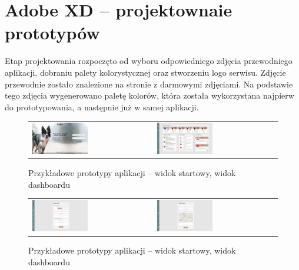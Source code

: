 \section{Adobe XD -- projektownaie prototypów}
Etap projektowania rozpoczęto od wyboru odpowiedniego zdjęcia przewodniego aplikacji, dobraniu palety kolorystycznej oraz stworzeniu logo serwisu. Zdjęcie przewodnie zostało znalezione na stronie z darmowymi zdjęciami. Na podstawie tego zdjęcia wygenerowano paletę kolorów, która została wykorzystana najpierw do prototypowania, a następnie już w samej aplikacji.
\begin{figure}[H]
    \centering
      \begin{tabular}{@{}ll@{}}
        \includegraphics[width=0.475\textwidth]{rysunki/Start.png} & 
        \includegraphics[width=0.475\textwidth]{rysunki/Home - owner.png}
      \end{tabular}
    \caption{Przykładowe prototypy aplikacji -- widok startowy, widok dashboardu}
    \label{fig:mocks-start-dashboard}
\end{figure}
\begin{figure}[H]
    \centering
      \begin{tabular}{@{}ll@{}}
        \includegraphics[width=0.475\textwidth]{rysunki/Home - dog creator.png} & 
        \includegraphics[width=0.475\textwidth]{rysunki/Home - walk creator.png}
      \end{tabular}
    \caption{Przykładowe prototypy aplikacji -- widok startowy, widok dashboardu}
    \label{fig:mocks-creators}
\end{figure}

